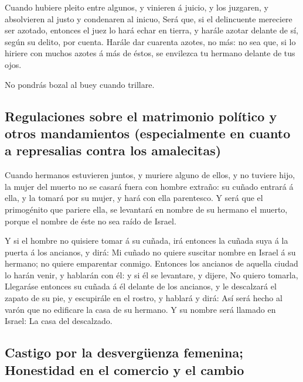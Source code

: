  Cuando hubiere pleito entre algunos, y vinieren á juicio, y
los juzgaren, y absolvieren al justo y condenaren al inicuo,
 Será que, si el delincuente mereciere ser azotado, entonces
el juez lo hará echar en tierra, y harále azotar delante de sí, según su
delito, por cuenta.  Harále dar cuarenta azotes, no más: no
sea que, si lo hiriere con muchos azotes á más de éstos, se envilezca tu
hermano delante de tus ojos.

 No pondrás bozal al buey cuando trillare.

\hypertarget{regulaciones-sobre-el-matrimonio-poluxedtico-y-otros-mandamientos-especialmente-en-cuanto-a-represalias-contra-los-amalecitas}{%
\subsection{Regulaciones sobre el matrimonio político y otros
mandamientos (especialmente en cuanto a represalias contra los
amalecitas)}\label{regulaciones-sobre-el-matrimonio-poluxedtico-y-otros-mandamientos-especialmente-en-cuanto-a-represalias-contra-los-amalecitas}}

 Cuando hermanos estuvieren juntos, y muriere alguno de
ellos, y no tuviere hijo, la mujer del muerto no se casará fuera con
hombre extraño: su cuñado entrará á ella, y la tomará por su mujer, y
hará con ella parentesco.  Y será que el primogénito que
pariere ella, se levantará en nombre de su hermano el muerto, porque el
nombre de éste no sea raído de Israel.

 Y si el hombre no quisiere tomar á su cuñada, irá entonces
la cuñada suya á la puerta á los ancianos, y dirá: Mi cuñado no quiere
suscitar nombre en Israel á su hermano; no quiere emparentar conmigo.
 Entonces los ancianos de aquella ciudad lo harán venir, y
hablarán con él: y si él se levantare, y dijere, No quiero tomarla,
 Llegaráse entonces su cuñada á él delante de los ancianos,
y le descalzará el zapato de su pie, y escupirále en el rostro, y
hablará y dirá: Así será hecho al varón que no edificare la casa de su
hermano.  Y su nombre será llamado en Israel: La casa del
descalzado.

\hypertarget{castigo-por-la-desverguxfcenza-femenina-honestidad-en-el-comercio-y-el-cambio}{%
\subsection{Castigo por la desvergüenza femenina; Honestidad en el
comercio y el
cambio}\label{castigo-por-la-desverguxfcenza-femenina-honestidad-en-el-comercio-y-el-cambio}}

